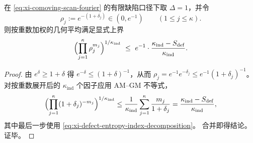 \begin{proposition}[熵缺口控制节点模长的加权几何平均]\label{prop:xi-entropy-gap-controls-geometric-mean-radius}
在 \eqref{eq:xi-comoving-scan-fourier} 的有限缺陷口径下取 \(\Delta=1\)，并令
\[
\rho_j:=e^{-(1+\delta_j)}\in(0,e^{-1})\qquad(1\le j\le \kappa).
\]
则按重数加权的几何平均满足显式上界
\[
\Bigl(\prod_{j=1}^{\kappa}\rho_j^{m_j}\Bigr)^{1/\kappa_{\mathrm{ind}}}
\ \le\
e^{-1}\cdot\frac{\kappa_{\mathrm{ind}}-S_{\mathrm{def}}}{\kappa_{\mathrm{ind}}}.
\]
\end{proposition}
\begin{proof}
由 \(e^{\delta}\ge 1+\delta\) 得 \(e^{-\delta}\le (1+\delta)^{-1}\)，从而
\(
\rho_j=e^{-1}e^{-\delta_j}\le e^{-1}(1+\delta_j)^{-1}
\)。
对按重数展开后的 \(\kappa_{\mathrm{ind}}\) 个因子应用 AM--GM 不等式，
\[
\Bigl(\prod_{j=1}^{\kappa}(1+\delta_j)^{-m_j}\Bigr)^{1/\kappa_{\mathrm{ind}}}
\le
\frac{1}{\kappa_{\mathrm{ind}}}\sum_{j=1}^{\kappa}\frac{m_j}{1+\delta_j}
=\frac{\kappa_{\mathrm{ind}}-S_{\mathrm{def}}}{\kappa_{\mathrm{ind}}},
\]
其中最后一步使用 \eqref{eq:xi-defect-entropy-index-decomposition}。
合并即得结论。证毕。
\end{proof}

\endinput
